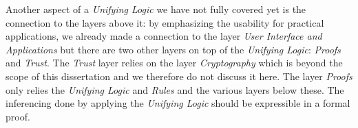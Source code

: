  Another aspect of a \emph{Unifying Logic} we have not fully covered yet is the connection to the layers above it: by emphasizing the usability for practical applications, 
 we already made a connection 
 to the layer \emph{User Interface and Applications} but there are two other layers on top of the \emph{Unifying Logic}: \emph{Proofs} and \emph{Trust}. 
 The \emph{Trust} layer relies 
 on the layer \emph{Cryptography} which is beyond the scope of this dissertation and we therefore do not discuss it here. 
 The layer \emph{Proofs} only relies 
the \emph{Unifying Logic} and \emph{Rules} and the various layers below these. 
The inferencing done by applying the \emph{Unifying Logic} should be expressible in a formal proof.
%
%
%


